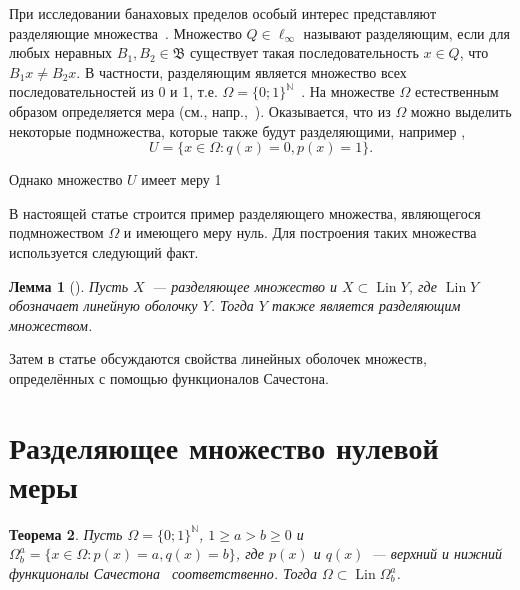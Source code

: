 \documentclass[a4paper,14pt]{article} %
\theoremstyle{plain}
\newtheorem{lemma}{Лемма}[section]
\newtheorem{theorem}[lemma]{Теорема}
\begin{document}
При исследовании банаховых пределов особый интерес представляют разделяющие множества~\cite[\S 3]{Semenov2014geomprops}.
Множество $Q\in\ell_\infty$ называют разделяющим, если
для любых неравных $B_1, B_2\in\mathfrak{B}$ существует такая последовательность $x\in Q$,
что $B_1 x \neq B_2 x$.
В частности, разделяющим является множество всех последовательностей из 0 и 1, т.е.
$\Omega=\{0;1\}^\mathbb{N}$~\cite{semenov2010characteristic}.
На множестве $\Omega$ естественным образом определяется мера (см., напр.,~\cite{connor1990almost}).
Оказывается, что из $\Omega$ можно выделить некоторые подмножества, которые также будут разделяющими,
например \cite[\S 3, Теорема 11]{Semenov2014geomprops},
\begin{equation}
	U = \{ x\in\Omega: q(x) = 0, p(x) = 1 \}
	.
\end{equation}

Однако множество $U$ имеет меру 1~\cite{semenov2010characteristic}

В настоящей статье строится пример разделяющего множества,
являющегося подмножеством $\Omega$ и имеющего меру нуль.
Для построения таких множества используется следующий факт.

\begin{lemma}[{\cite[\S 3, замечание 6]{Semenov2014geomprops}}]
	Пусть $X$~--- разделяющее множество и $X \subset \operatorname{Lin} Y$,
	где $\operatorname{Lin} Y$ обозначает линейную оболочку $Y$.
	Тогда $Y$ также является разделяющим множеством.
\end{lemma}
Затем в статье обсуждаются свойства линейных оболочек множеств, определённых с помощью функционалов Сачестона.

\section{Разделяющее множество нулевой меры}

\begin{theorem}
	\label{thm:Lin_Omega_Sucheston}
	Пусть $\Omega = \{0;1\}^\mathbb{N}$,
	$1 \geq a > b \geq 0$ и
	$\Omega^a_b = \{x\in\Omega : p(x) = a, q(x) = b\}$,
	где $p(x)$ и $q(x)$~--- верхний и нижний функционалы Сачестона~\cite{sucheston1967banach} соответственно.
	Тогда $\Omega \subset \operatorname{Lin} \Omega^a_b$.
\end{theorem}
\end{document}
